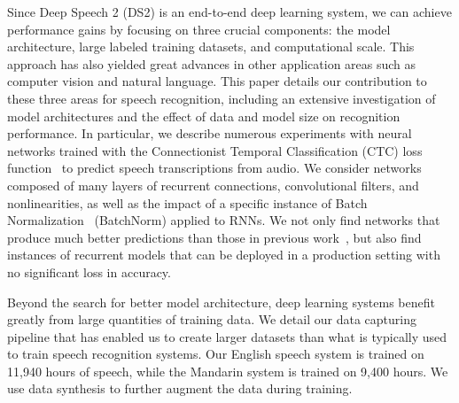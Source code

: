 Since {Deep Speech 2} (DS2) is an end-to-end deep learning system, we can
achieve performance gains by focusing on three crucial components:  the model
architecture, large labeled training datasets, and computational scale. This
approach has also yielded great advances in other application areas such as
computer vision and natural language.  This paper details our contribution to
these three areas for speech recognition, including an extensive investigation
of model architectures and the effect of data and model size on recognition
performance.  In particular, we describe numerous experiments with neural
networks trained with the Connectionist Temporal Classification (CTC) loss
function~\cite{graves2006} to predict speech transcriptions from audio.  We
consider networks composed of many layers of recurrent connections,
convolutional filters, and nonlinearities, as well as the impact of a specific
instance of Batch Normalization~\cite{ioffe2015batch} (BatchNorm) applied to
RNNs.  We not only find networks that produce much better predictions than
those in previous work~\cite{hannun2014deepspeech}, but also find instances of
recurrent models that can be deployed in a production setting with no
significant loss in accuracy.

Beyond the search for better model architecture, deep learning systems benefit
greatly from large quantities of training data.  We detail our data capturing
pipeline that has enabled us to create larger datasets than what is typically
used to train speech recognition systems.  Our English speech system is trained
on 11,940 hours of speech, while the Mandarin system is trained on 9,400 hours.
We use data synthesis to further augment the data during training.

